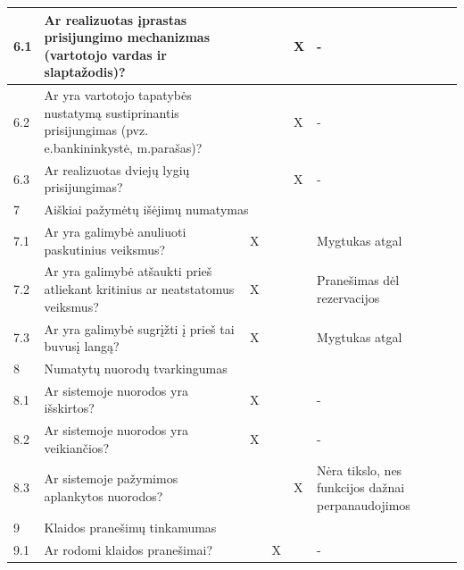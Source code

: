 \documentclass{VUMIFPSkursinis}
\begin{document}
\begin{longtable}[c]{|p{1cm}|p{4cm}|p{1cm}|p{1cm}|p{1.6cm}|p{4cm}|}
6.1   & Ar realizuotas įprastas prisijungimo mechanizmas (vartotojo vardas ir slaptažodis)?                  &     &     &     X     &   -          \\ \hline
6.2   & Ar yra vartotojo tapatybės nustatymą sustiprinantis prisijungimas (pvz. e.bankininkystė, m.parašas)? &     &     &     X     &   -          \\ \hline
6.3   & Ar realizuotas dviejų lygių prisijungimas?                                                           &     &     &     X     &   -          \\ \hline
7     & \multicolumn{5}{l|}{Aiškiai pažymėtų išėjimų numatymas}                                                                                    \\ \hline
7.1   & Ar yra galimybė anuliuoti paskutinius veiksmus?                                                      &  X  &     &           &   Mygtukas atgal          \\ \hline
7.2   & Ar yra galimybė atšaukti prieš atliekant kritinius ar neatstatomus veiksmus?                         &  X  &     &           &   Pranešimas dėl rezervacijos     \\ \hline
7.3   & Ar yra galimybė sugrįžti į prieš tai buvusį langą?                                                   &  X  &     &           &   Mygtukas atgal  \\ \hline
8     & \multicolumn{5}{l|}{Numatytų nuorodų tvarkingumas}                                                                                         \\ \hline
8.1   & Ar sistemoje nuorodos yra išskirtos?                                                                 &  X  &     &           &   -  \\ \hline
8.2   & Ar sistemoje nuorodos yra veikiančios?                                                               &  X  &     &           &   -         \\ \hline
8.3   & Ar sistemoje pažymimos aplankytos nuorodos?                                                          &     &     &     X     &   Nėra tikslo, nes funkcijos dažnai perpanaudojimos         \\ \hline
9     & \multicolumn{5}{l|}{Klaidos pranešimų tinkamumas}                                                                                          \\ \hline
9.1   & Ar rodomi klaidos pranešimai?                                                                        &     &  X  &           &   -          \\ \hline

\end{longtable}
\end{document}
